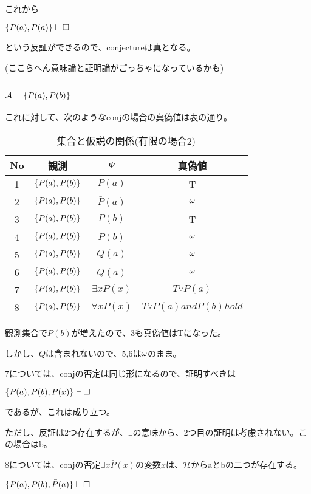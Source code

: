 \documentclass[10pt, oneside]{jarticle}   	%
\begin{document}
これから

$\{{P(a), P(a)}\} \vdash \Box$ 

という反証ができるので、conjectureは真となる。

(ここらへん意味論と証明論がごっちゃになっているかも)


\subsection{$\mathcal{A}=\{{P(a), P(b)}\}$}
これに対して、次のようなconjの場合の真偽値は表の通り。

\begin{table}[htbp]
 \centering
 \begin{tabular}{|c|c|c|c|}\hline
   No & 観測 & $\Psi$ & 真偽値 \\ \hline
   1 & $\{{P(a), P(b)}\}$ & $P(a)$ & T \\ \hline
   2 & $\{{P(a), P(b)}\}$ & $\bar P(a)$ & $\omega$  \\ \hline
   3 & $\{{P(a), P(b)}\}$ & $P(b)$ & T \\ \hline
   4 & $\{{P(a), P(b)}\}$ & $\bar P(b)$ & $\omega$  \\ \hline
   5 & $\{{P(a), P(b)}\}$ & $Q(a)$ & $\omega$ \\ \hline
   6 & $\{{P(a), P(b)}\}$ & $\bar Q(a)$ & $\omega$ \\ \hline
   7 & $\{{P(a), P(b)}\}$ & $\exists x P(x)$ & $T \because P(a)$ \\ \hline
   8 & $\{{P(a), P(b)}\}$ & $\forall x P(x)$ & $T \because  P(a) and P(b) hold$ \\ \hline
 \end{tabular}
 \caption{集合と仮説の関係(有限の場合2)}
 \label{tab:ex0102}
\end{table}

観測集合で$P(b)$が増えたので、3も真偽値はTになった。

しかし、$Q$は含まれないので、5,6は$\omega$のまま。

7については、conjの否定は同じ形になるので、証明すべきは

$\{{P(a), P(b), P(x)}\} \vdash \Box$ 

であるが、これは成り立つ。

ただし、反証は2つ存在するが、$\exists$の意味から、2つ目の証明は考慮されない。この場合はb。

8については、conjの否定$\exists x \bar P(x)$の変数$x$は、$\mathcal{H}$からaとbの二つが存在する。

$\{P(a), P(b), \bar P(a)\} \vdash \Box$
\end{document}
